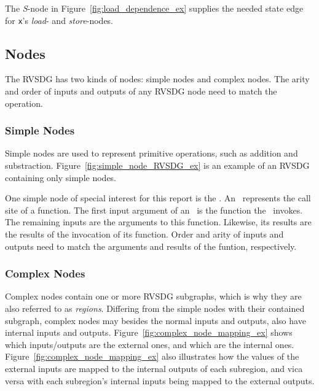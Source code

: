 The \textit{S}-node in Figure~\ref{fig:load_dependence_ex} supplies the needed
state edge for \lstinline!x!'s \textit{load}- and \textit{store}-nodes.

\subsection{Nodes}

The RVSDG has two kinds of nodes: simple nodes and complex nodes. The arity and
order of inputs and outputs of any RVSDG node need to match the operation.

\subsubsection{Simple Nodes}

Simple nodes are used to represent primitive operations, such as addition and
substraction. Figure~\ref{fig:simple_node_RVSDG_ex} is an example of an RVSDG
containing only simple nodes.

One simple node of special interest for this report is the \applyNode . An
\applyNode~represents the call site of a function. The first input argument of
an \applyNode~is the function the \applyNode~invokes. The remaining inputs are
the arguments to this function. Likewise, its results are the results of the
invocation of its function. Order and arity of inputs and outputs need to match
the arguments and results of the funtion, respectively.

\subsubsection{Complex Nodes}

Complex nodes contain one or more RVSDG subgraphs, which is why they are also
referred to as \textit{regions}. Differing from the simple nodes with their
contained subgraph, complex nodes may besides the normal inputs and outputs,
also have internal inputs and outputs. Figure~\ref{fig:complex_node_mapping_ex}
shows which inputs/outputs are the external ones, and which are the internal
ones. Figure~\ref{fig:complex_node_mapping_ex} also illustrates how the values
of the external inputs are mapped to the internal outputs of each subregion, and
vica versa with each subregion's internal inputs being mapped to the external
outputs.

